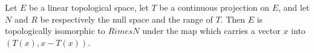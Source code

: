Let $E$ be a linear topological space, let $T$ be a continuous projection on $E$, and let $N$ and $R$ be respectively the null space and the range of $T$. Then $E$ is topologically isomorphic to $R 	imes N$ under the map which carries a vector $x$ into $(T(x), x - T(x))$.
